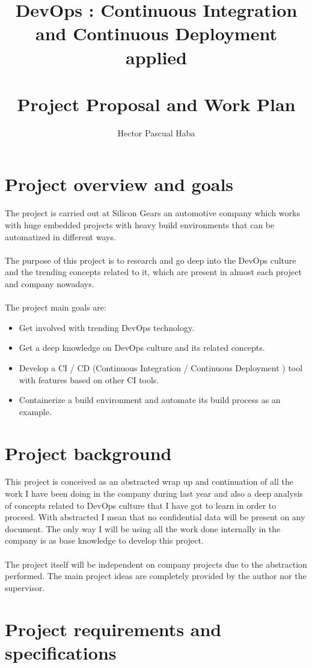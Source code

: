 \documentclass[a4paper]{article}
\title{\textbf{DevOps : Continuous Integration and Continuous Deployment applied} \\~\\
\large \textbf{Project Proposal and Work Plan}}
\author{Hector Pascual Haba}
\begin{document}
\maketitle 

\section{Project overview and goals}
The project is carried out at Silicon Gears an automotive company which works with huge embedded projects with heavy build environments that can be automatized in different ways.
\\~\\
The purpose of this project is to research and go deep into the DevOps culture and the trending concepts related to it, which are present in almost each project and company nowadays.
\\~\\
The project main goals are:
\begin{itemize}
	\item Get involved with trending DevOps technology.
	\item Get a deep knowledge on DevOps culture and its related concepts.
	\item Develop a CI / CD (Continuous Integration / Continuous Deployment ) tool with features based on other CI tools.
	\item Containerize a build environment and automate its build process as an example.
\end{itemize}


\section{Project background}

This project is conceived as an abstracted wrap up and continuation of all the work I have been doing in the company during last year and also a deep analysis of concepts related to DevOps culture that I have got to learn in order to proceed. With abstracted I mean that no confidential data will be present on any document. The only way I will be using all the work done internally in the company is as base knowledge to develop this project.
\\~\\
The project itself will be independent on company projects due to the abstraction performed. 
The main project ideas are completely provided by the author nor the supervisor.

\section{Project requirements and specifications}
\end{document}

